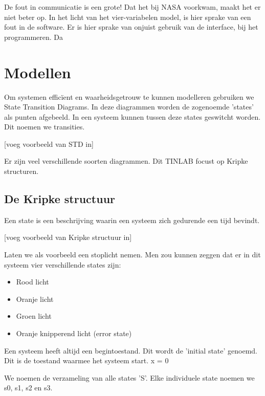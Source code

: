 \documentclass{article}
\begin{document}
					De fout in communicatie is een grote! Dat het bij NASA voorkwam, maakt het er niet beter op. In het licht van het vier-variabelen model, is hier sprake van een fout in de software. Er is hier sprake van onjuist gebruik van de interface, bij het programmeren. Da
		
	\newpage
	
	
	\section{Modellen}
	
	Om systemen efficïent en waarheidsgetrouw te kunnen modelleren gebruiken we State Transition Diagrams. In deze diagrammen worden de zogenoemde 'states' als punten afgebeeld. In een systeem kunnen tussen deze states geswitcht worden. Dit noemen we transities.

	[voeg voorbeeld van STD in]

	Er zijn veel verschillende soorten diagrammen. Dit TINLAB focust op Kripke structuren.
	
		\subsection{De Kripke structuur}
		
		Een state is een beschrijving waarin een systeem zich gedurende een tijd bevindt.

		[voeg voorbeeld van Kripke structuur in]

		Laten we als voorbeeld een stoplicht nemen. Men zou kunnen zeggen dat er in dit systeem vier verschillende states zijn:

		\begin{itemize}
			\item Rood licht
			\item Oranje licht
			\item Groen licht
			\item Oranje knipperend licht (error state)
		\end{itemize}

		Een systeem heeft altijd een begintoestand. Dit wordt de 'initial state' genoemd. Dit is de toestand waarmee het systeem start. 
		x = 0

		We noemen de verzameling van alle states 'S'. Elke individuele state noemen we s0, s1, s2 en s3.
\end{document}
